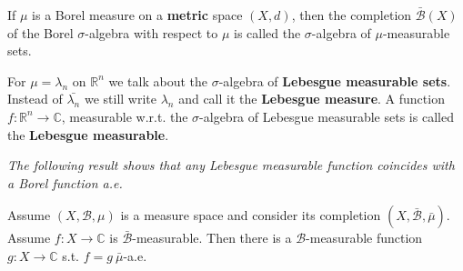
\begin{definition}
    If \(\mu\) is a Borel measure on a \textbf{metric} space \((X,d)\), then the completion \(\bar{\mathscr{B}}(X)\) of the Borel \(\sigma\)-algebra
    with respect to \(\mu\) is called the \(\sigma\)-algebra of \(\mu\)-measurable sets. 
\end{definition}
\begin{remark}
    For \(\mu=\lambda_n\) on \(\mathbb{R}^n\) we talk about the \(\sigma\)-algebra of \textbf{Lebesgue measurable sets}. Instead of
    \(\bar{\lambda_n}\) we still write \(\lambda_n\) and call it the \textbf{Lebesgue measure}. A function \(f:\mathbb{R}^n\rightarrow \mathbb{C}\),
    measurable w.r.t. the \(\sigma\)-algebra of Lebesgue measurable sets is called the \textbf{Lebesgue measurable}.
\end{remark}
\emph{The following result shows that any Lebesgue measurable function coincides with a Borel function a.e.}
\begin{proposition}
    Assume \(\left( X,\mathscr{B},\mu \right)\) is a measure space and consider its completion \(\left( X,\bar{\mathscr{B}},\bar{\mu} \right)\).
    Assume \(f:X\rightarrow\mathbb{C}\) is \(\bar{\mathscr{B}}\)-measurable. Then there is a \(\mathscr{B}\)-measurable function 
    \(g:X\rightarrow\mathbb{C}\) s.t. \(f=g \ \bar{\mu}\)-a.e.
\end{proposition}